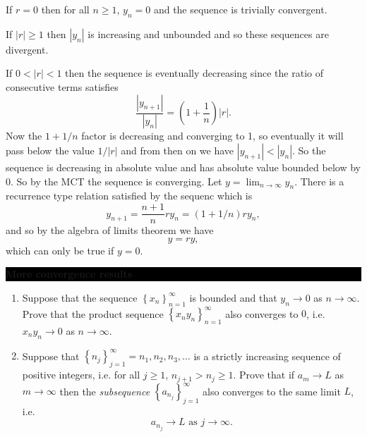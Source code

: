 \documentclass[oneside,10pt]{amsart}
\newcommand{\cbox}[1]{\colorbox{black}{\begin{minipage}{\linewidth}\color{white}\sffamily #1 \end{minipage}}}
\newcommand{\topic}[1]{\cbox{\textbf{#1}}}
\newcounter{pass}
\newif\ifshowanswers
\newcommand{\solution}[1]{\ifshowanswers{\newline\colorbox{black!20}{\begin{minipage}{\linewidth}\color{black}{#1}\end{minipage}}
}\else\fi}
\begin{document}
\begin{enumerate}
{If $r=0$ then for all $n \geq 1$, $y_n = 0$ and the sequence is trivially convergent.

If $|r| \geq 1$ then $|y_n|$ is increasing and unbounded and so these sequences are divergent.

If $0<|r| < 1$ then the sequence is eventually decreasing since the ratio of consecutive terms satisfies
$$\frac{|y_{n+1}|}{|y_n|} = \left ( 1 + \frac{1}{n} \right ) |r|.$$
Now the $1+1/n$ factor is decreasing and converging to 1, so eventually it will pass below the value $1/|r|$ and from then on we have $|y_{n+1}| < |y_n|$. So the sequence is decreasing in absolute value and has absolute value bounded below by 0. So by the MCT the sequence is converging. Let $y = \lim_{n \to \infty} y_n$. There is a recurrence type relation satisfied by the sequenc which is
$$ y_{n+1} = \frac{n+1}{n} r y_n = (1+1/n)r y_n,$$
and so by the algebra of limits theorem we have
$$ y = r y,$$
which can only be true if $y=0$.
}
\setcounter{pass}{\value{enumi}}
\end{enumerate}


\topic{More convergence results}
\begin{enumerate}
\setcounter{enumi}{\value{pass}}
\item
Suppose that the sequence $\left \{ x_n \right \}_{n=1}^\infty$ is bounded and that $y_n \to 0$ as $n \to \infty$. Prove that the product sequence $\left \{ x_n y_n \right \}_{n=1}^\infty$ also converges to $0$, i.e. $x_n y_n \to 0$ as $n \to \infty$.
\solution{
Let $M$ be a bound for the sequence $\{x_n\}$, i.e. for all $n$, $|x_n| \leq M$. Let $\epsilon > 0$ be given. Since $y_n$ converges to 0 there will exist an $N$ such that if $n \geq N$ then $|y_n| < \epsilon / M$. Then for all $n \geq N$ we have
\begin{align*}
|x_n y_n | & = |x_n| |y_n| \\
& \leq M |y_n| \\
& < M \epsilon / M = \epsilon.
\end{align*}
This proves that $x_n y_n \to 0$ as required.
}
\item
Suppose that $\left \{ n_j \right \}_{j=1}^\infty = n_1, n_2, n_3, \dots$ is a strictly increasing sequence of positive integers, i.e. for all $j \geq 1$, $n_{j+1} > n_j \geq 1$. Prove that if $a_m \to L$ as $m \to \infty$ then the \emph{subsequence} $\left \{ a_{n_j} \right \}_{j=1}^\infty$ also converges to the same limit $L$, i.e.
$$ a_{n_j} \to L \text{ as } j \to \infty.$$
\solution{This results says that every subsequence of a convergent sequence is also convergent and tending to the same limit as the sequence itself. It's an example of something that kind of takes more work to state the result carefully than it does to prove it.

Simply put, for all $\epsilon > 0$ there exists a $N_\epsilon$ such that $n \geq N_\epsilon$ implies $|a_n - L| < \epsilon $. This is the definition of convergence for $a_n \to L$. The very same choice of $N_\epsilon$ will work for the subsequence as if $j \geq N_\epsilon$ then $n_j \geq N_\epsilon$ since $n_j \geq j$. There $a_{n_j} \to L$ as required.
}
\setcounter{pass}{\value{enumi}}
\end{enumerate}
\end{document}
